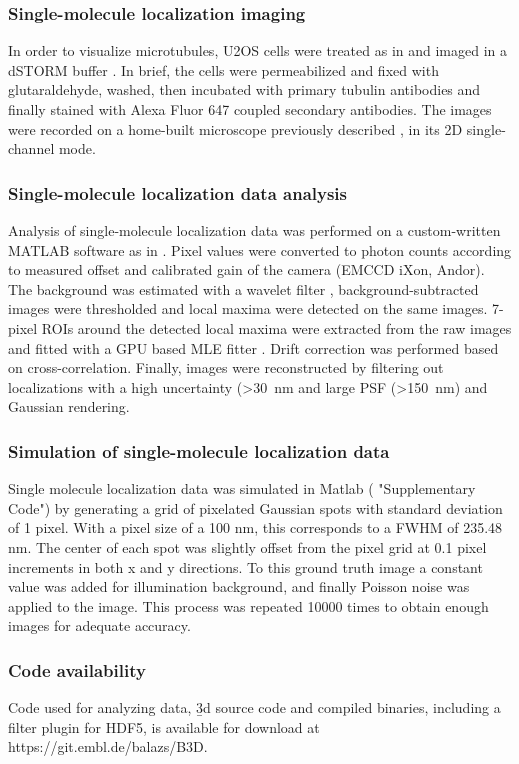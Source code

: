 \subsubsection{Single-molecule localization imaging}
In order to visualize microtubules, U2OS cells were treated as in \cite{deschamps_3d_2014} and imaged in a dSTORM buffer \cite{heilemann_subdiffraction-resolution_2008}. In brief, the cells were permeabilized and fixed with glutaraldehyde, washed, then incubated with primary tubulin antibodies and finally stained with Alexa Fluor 647 coupled secondary antibodies. The images were recorded on a home-built microscope previously described \cite{deschamps_3d_2014}, in its 2D single-channel mode.

\subsubsection{Single-molecule localization data analysis}
Analysis of single-molecule localization data was performed on a custom-written MATLAB software as in \cite{deschamps_efficient_2016}. Pixel values were converted to photon counts according to measured offset and calibrated gain of the camera (EMCCD iXon, Andor). The background was estimated with a wavelet filter \cite{izeddin_wavelet_2012}, background-subtracted images were thresholded and local maxima were detected on the same images. 7-pixel ROIs around the detected local maxima were extracted from the raw images and fitted with a GPU based MLE fitter \cite{smith_fast_2010}. Drift correction was performed based on cross-correlation. Finally, images were
reconstructed by filtering out localizations with a high uncertainty (>\SI{30}{nm} and large PSF (>\SI{150}{nm}) and Gaussian rendering.

\subsubsection{Simulation of single-molecule localization data}
Single molecule localization data was simulated in Matlab ( "Supplementary Code") by generating a grid of pixelated Gaussian spots with standard deviation of 1 pixel. With a pixel size of a 100 nm, this corresponds to a FWHM of 235.48 nm. The center of each spot was slightly offset from the pixel grid at 0.1 pixel increments in both x and y directions. To this ground truth image a constant value was added for illumination background, and finally Poisson noise was applied to the image. This process was repeated 10000 times to obtain enough images for adequate accuracy.

\subsubsection{Code availability}
Code used for analyzing data, \b3d source code and compiled binaries, including a filter plugin for HDF5, is available for download at https://git.embl.de/balazs/B3D.
